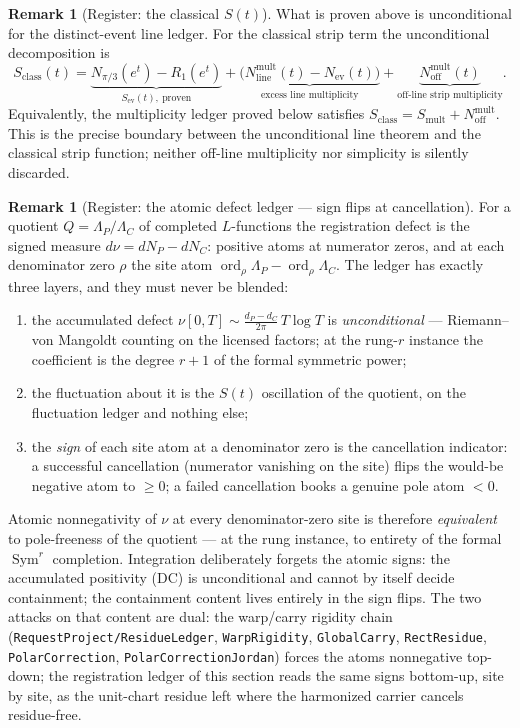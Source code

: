 \documentclass[11pt]{article}
\theoremstyle{definition}
\newtheorem{remark}[theorem]{Remark}
\newcommand{\Sym}{\operatorname{Sym}}
\begin{document}
\begin{remark}[Register: the classical $S(t)$]\label{rem:st-register}
What is proven above is unconditional for the distinct-event line ledger.
For the classical strip term the unconditional decomposition is
\[
S_{\mathrm{class}}(t)=
\underbrace{N_{\pi/3}(e^t)-R_1(e^t)}_{S_{\mathrm{ev}}(t),\ \text{proven}}
+\underbrace{\bigl(N_{\mathrm{line}}^{\mathrm{mult}}(t)-N_{\mathrm{ev}}(t)\bigr)}
 _{\text{excess line multiplicity}}
+\underbrace{N_{\mathrm{off}}^{\mathrm{mult}}(t)}_{\text{off-line strip multiplicity}}.
\]
Equivalently, the multiplicity ledger proved below satisfies
\(S_{\mathrm{class}}=S_{\mathrm{mult}}+N_{\mathrm{off}}^{\mathrm{mult}}\).
This is the precise boundary between the unconditional line theorem and the
classical strip function; neither off-line multiplicity nor simplicity is
silently discarded.
\end{remark}

\begin{remark}[Register: the atomic defect ledger --- sign flips at
cancellation]\label{rem:atomic-ledger}
For a quotient $Q=\Lambda_P/\Lambda_C$ of completed $L$-functions the
registration defect is the signed measure $d\nu=dN_P-dN_C$: positive atoms
at numerator zeros, and at each denominator zero $\rho$ the site atom
$\operatorname{ord}_\rho\Lambda_P-\operatorname{ord}_\rho\Lambda_C$.  The
ledger has exactly three layers, and they must never be blended:
\begin{enumerate}
\item[\textup{(DC)}] the accumulated defect
$\nu[0,T]\sim\frac{d_P-d_C}{2\pi}\,T\log T$ is \emph{unconditional} ---
Riemann--von Mangoldt counting on the licensed factors; at the rung-$r$
instance the coefficient is the degree $r+1$ of the formal symmetric power;
\item[\textup{(AC)}] the fluctuation about it is the $S(t)$ oscillation of
the quotient, on the fluctuation ledger and nothing else;
\item[\textup{(atoms)}] the \emph{sign} of each site atom at a denominator
zero is the cancellation indicator: a successful cancellation (numerator
vanishing on the site) flips the would-be negative atom to $\geq0$; a
failed cancellation books a genuine pole atom $<0$.
\end{enumerate}
Atomic nonnegativity of $\nu$ at every denominator-zero site is therefore
\emph{equivalent} to pole-freeness of the quotient --- at the rung instance,
to entirety of the formal $\Sym^r$ completion.  Integration deliberately
forgets the atomic signs: the accumulated positivity (DC) is unconditional
and cannot by itself decide containment; the containment content lives
entirely in the sign flips.  The two attacks on that content are dual: the
warp/carry rigidity chain
(\texttt{RequestProject/ResidueLedger}, \texttt{WarpRigidity},
\texttt{GlobalCarry}, \texttt{RectResidue}, \texttt{PolarCorrection},
\texttt{PolarCorrectionJordan}) forces the atoms nonnegative top-down;
the registration ledger of this section reads the same signs bottom-up,
site by site, as the unit-chart residue left where the harmonized carrier
cancels residue-free.
\end{remark}
\end{document}
